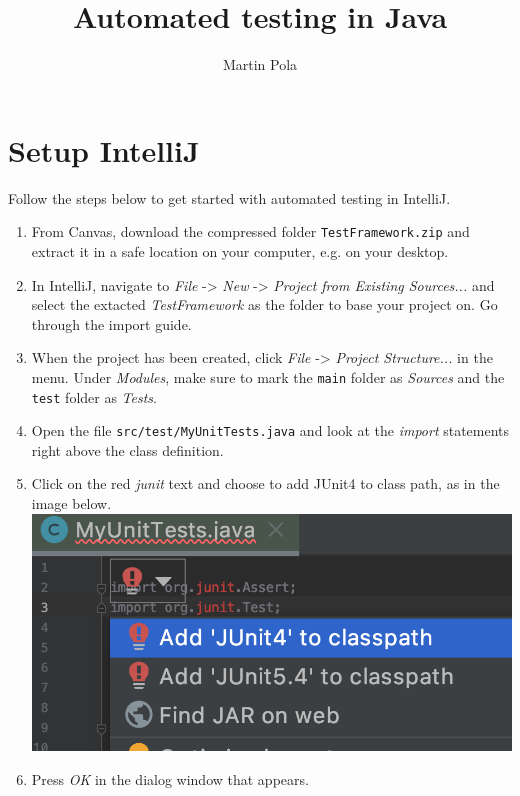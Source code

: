 \documentclass[a4paper, english]{article}
\title{Automated testing in Java}
\author{Martin Pola}
\date{}
\begin{document}
    \maketitle

    \section{Setup IntelliJ}
        Follow the steps below to get started with automated testing in IntelliJ.

        \begin{enumerate}
            \item From Canvas, download the compressed folder \texttt{TestFramework.zip} and extract it in a safe location on your computer, e.g. on your desktop.

            \item In IntelliJ, navigate to \emph{File} -> \emph{New} -> \emph{Project from Existing Sources...} and select the extacted \emph{TestFramework} as the folder to base your project on. Go through the import guide.

            \item When the project has been created, click \emph{File} -> \emph{Project Structure...} in the menu. Under \emph{Modules}, make sure to mark the \texttt{main} folder as \emph{Sources} and the \texttt{test} folder as \emph{Tests}.

            \item Open the file \texttt{src/test/MyUnitTests.java} and look at the \emph{import} statements right above the class definition.

            \item Click on the red \emph{junit} text and choose to add JUnit4 to class path, as in the image below. \\
             \includegraphics[width=\textwidth]{add-junit4.png}

            \item Press \emph{OK} in the dialog window that appears.
        \end{enumerate}
\end{document}
